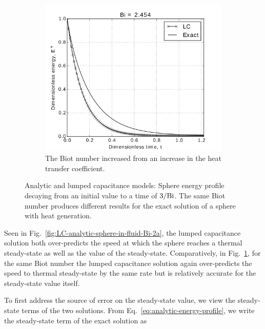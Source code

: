 \begin{figure}
        \begin{subfigure}[b]{0.5\textwidth}
                \includegraphics[width=\textwidth]{chapters/figures/LC-analytic-sphere-in-fluid-Bi-2b}
                \caption{The Biot number increased from  an increase in the heat transfer coefficient.}
				\label{fig:LC-analytic-sphere-in-fluid-Bi-2b}
        \end{subfigure}
        \caption[Analytic temperature profile for moderate Biot number]{Analytic and lumped capacitance models: Sphere energy profile decaying from an initial value to a time of $3/\mathrm{Bi}$. The same Biot number produces different results for the exact solution of a sphere with heat generation.}\label{fig:LC-analytic-sphere-in-fluid-Bi-2}
\end{figure}

Seen in Fig.~\ref{fig:LC-analytic-sphere-in-fluid-Bi-2a}, the lumped capacitance solution both over-predicts the speed at which the sphere reaches a thermal steady-state as well as the value of the steady-state. Comparatively, in Fig.~\ref{fig:LC-analytic-sphere-in-fluid-Bi-2b}, for the same Biot number the lumped capacitance solution again over-predicts the speed to thermal steady-state by the same rate but is relatively accurate for the steady-state value itself. 

To first address the source of error on the steady-state value, we view the steady-state terms of the two solutions. From Eq.~\ref{eq:analytic-energy-profile}, we write the steady-state term of the exact solution as 

